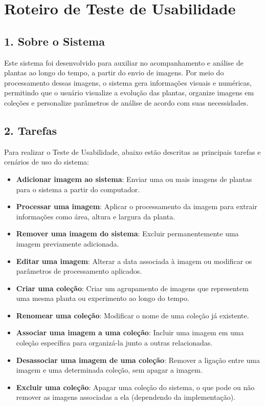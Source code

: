 \chapter{Roteiro de Teste de Usabilidade}
\label{chap:roteiro_teste_usabilidade}

\section*{1. Sobre o Sistema}

Este sistema foi desenvolvido para auxiliar no acompanhamento e análise de plantas ao longo do tempo, a partir do envio de imagens. Por meio do processamento dessas imagens, o sistema gera informações visuais e numéricas, permitindo que o usuário visualize a evolução das plantas, organize imagens em coleções e personalize parâmetros de análise de acordo com suas necessidades.

\section*{2. Tarefas}

Para realizar o Teste de Usabilidade, abaixo estão descritas as principais tarefas e cenários de uso do sistema:

\begin{itemize}
    \item \textbf{Adicionar imagem ao sistema}: Enviar uma ou mais imagens de plantas para o sistema a partir do computador.
    
    \item \textbf{Processar uma imagem}: Aplicar o processamento da imagem para extrair informações como área, altura e largura da planta.
    
    \item \textbf{Remover uma imagem do sistema}: Excluir permanentemente uma imagem previamente adicionada.
    
    \item \textbf{Editar uma imagem}: Alterar a data associada à imagem ou modificar os parâmetros de processamento aplicados.
    
    \item \textbf{Criar uma coleção}: Criar um agrupamento de imagens que representem uma mesma planta ou experimento ao longo do tempo.
    
    \item \textbf{Renomear uma coleção}: Modificar o nome de uma coleção já existente.
    
    \item \textbf{Associar uma imagem a uma coleção}: Incluir uma imagem em uma coleção específica para organizá-la junto a outras relacionadas.
    
    \item \textbf{Desassociar uma imagem de uma coleção}: Remover a ligação entre uma imagem e uma determinada coleção, sem apagar a imagem.
    
    \item \textbf{Excluir uma coleção}: Apagar uma coleção do sistema, o que pode ou não remover as imagens associadas a ela (dependendo da implementação).
\end{itemize}

